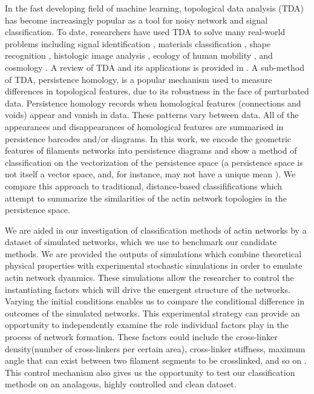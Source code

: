 \documentclass[10pt]{article}
\begin{document}
In the fast developing field of machine learning, topological data analysis (TDA) has become increasingly popular as a tool for noisy network and signal classification. To date, researchers have used TDA to solve many real-world problems including signal identification \cite{marchese2016topological}, materials classification \cite{hiraoka2016hierarchical,maroulas2019bayesian}, shape recognition \cite{bonis2016persistence,li2014persistence}, histologic image analysis \cite{belchi2018lung,nicolau2011topology,singh2014topological}, ecology of human mobility \cite{chen2017measuring,chen2019generalized}, and cosmology \cite{sousbie2011persistent,van2010alpha}. A review of TDA and its applications is provided in \cite{wasserman2018topological}. A sub-method of TDA, persistence homology, is a popular mechanism used to measure differences in topological features, due to its robustness in the face of purturbated data. Persistence homology records when homological features (connections and voids) appear and vanish in data. These patterns vary between data. All of the appearances and disappearances of homological features are summarised in persistence barcodes and/or diagrams. In this work, we encode the geometric features of filaments networks into persistence diagrams and show a method of classification on the vectorization of the persistence space (a persistence space is not itself a vector space, and, for instance, may not have a unique mean \cite{mileyko2011probability}). We compare this approach to traditional, distance-based classififications which attempt to summarize the similarities of the actin network topologies in the persistence space.

We are aided in our investigation of classification methods of actin networks by a dataset of simulated networks, which we use to benchmark our candidate methods. We are provided the outputs of simulations which combine theoretical physical properties with experimental stochastic simulations in order to emulate actin network dyanmics. These simulations allow the researcher to control the instantiating factors which will drive the emergent structure of the networks. Varying the initial conditions enables us to compare the conditional difference in outcomes of the simulated networks. This experimental strategy can provide an opportunity to independently examine the role individual factors play in the process of network formation. These factors could include the cross-linker density(number of cross-linkers per certain area), cross-linker stiffness, maximum angle that can exist between two filament segments to be crosslinked, and so on \cite{freedman2017versatile,freedman2018nonequilibrium}. This control mechanism also gives us the opportunity to test our classification methods on an analagous, highly controlled and clean dataset.
\end{document}
